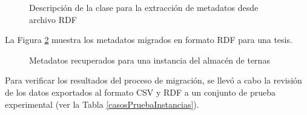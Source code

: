 \begin{figure}[!ht]
	\centering
    \caption{Descripci\'on de la clase para la extracci\'on de metadatos desde archivo RDF}
    \label{claseExtraccion}
\end{figure}

La Figura \ref{metadatosRecuperados} muestra los metadatos migrados en formato RDF para una tesis.

\begin{figure}[!ht]
	\centering
    \caption{Metadatos recuperados para una instancia del almac\'en de ternas}
    \label{metadatosRecuperados}
\end{figure}

Para verificar los resultados del proceso de migraci\'on, se llev\'o a cabo la revisi\'on de los datos exportados al formato CSV y RDF a un conjunto de prueba experimental (ver la Tabla \ref{casosPruebaInstancias}).\newline

